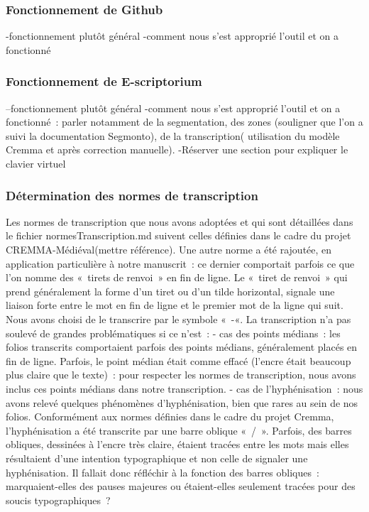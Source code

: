 \documentclass[12pt,a4paper,oneside]{article} %
\begin{document}
\subsubsection{Fonctionnement de Github}
-fonctionnement plutôt général
-comment nous s’est approprié l’outil et on a fonctionné
\subsubsection{Fonctionnement de E-scriptorium}
--fonctionnement plutôt général
-comment nous s’est approprié l’outil et on a fonctionné : parler notamment de la segmentation, des zones (souligner que l’on a suivi la documentation Segmonto), de la transcription( utilisation du modèle Cremma et après correction manuelle).
-Réserver une section pour expliquer le clavier virtuel
\subsubsection{Détermination des normes de transcription}
Les normes de transcription que nous avons adoptées et qui sont détaillées dans le fichier normesTranscription.md suivent celles définies dans le cadre du projet CREMMA-Médiéval(mettre référence). Une autre norme a été rajoutée, en application particulière à notre manuscrit : ce dernier comportait parfois ce que l’on nomme des « tirets de renvoi » en fin de ligne. Le « tiret de renvoi » qui prend  généralement la forme d’un tiret ou d’un tilde horizontal, signale une liaison forte entre le mot en fin de ligne et  le premier mot de la ligne qui suit. Nous avons choisi de le transcrire par le symbole « -«.  
La transcription n’a pas soulevé de grandes problématiques si ce n’est :
- cas des points médians : les folios transcrits comportaient parfois des points médians, généralement placés en fin de ligne. Parfois, le point médian était comme effacé (l’encre était beaucoup plus claire que le texte) : pour respecter les normes de transcription, nous avons inclus ces points médians dans notre transcription.
- cas de l’hyphénisation : nous avons relevé quelques phénomènes d’hyphénisation, bien que rares au sein de nos folios. Conformément aux normes définies dans le cadre du projet Cremma, l’hyphénisation a été transcrite par une barre oblique « / ». Parfois, des barres obliques, dessinées à l’encre très claire, étaient tracées entre les mots mais elles résultaient d’une intention typographique et non celle de signaler une hyphénisation. Il fallait donc réfléchir à la fonction des barres obliques : marquaient-elles des pauses majeures ou étaient-elles seulement tracées pour des soucis typographiques ?
\end{document}
